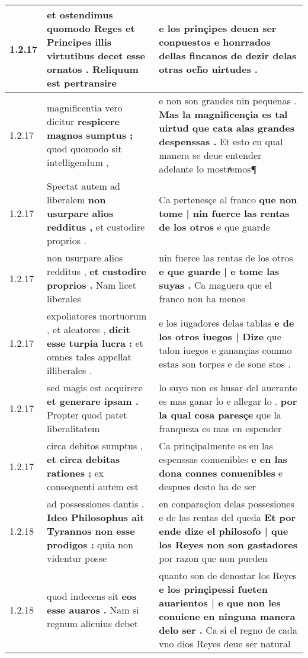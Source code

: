 \begin{tabular}{|p{1cm}|p{6.5cm}|p{6.5cm}|}
1.2.17 & et ostendimus quomodo Reges et Principes illis virtutibus decet \textbf{ esse ornatos . } Reliquum est pertransire & e los prinçipes deuen ser conpuestos e honrrados \textbf{ dellas fincanos } de dezir delas otras och̃o uirtudes . \\\hline
1.2.17 & magnificentia vero dicitur \textbf{ respicere magnos sumptus ; } quod quomodo sit intelligendum , & e non son grandes nin pequenas . \textbf{ Mas la magnificençia es tal uirtud que cata alas grandes despenssas . } Et esto en qual manera se deue entender adelante lo mostrͣemos¶ \\\hline
1.2.17 & Spectat autem ad liberalem \textbf{ non usurpare alios redditus , } et custodire proprios . & Ca pertenesçe al franco \textbf{ que non tome | nin fuerce las rentas de los otros } e que guarde \\\hline
1.2.17 & non usurpare alios redditus , \textbf{ et custodire proprios . } Nam licet liberales & nin fuerce las rentas de los otros \textbf{ e que guarde | e tome las suyas . } Ca maguera que el franco non ha menos \\\hline
1.2.17 & expoliatores mortuorum , et aleatores , \textbf{ dicit esse turpia lucra : } et omnes tales appellat illiberales . & e los iugadores delas tablas \textbf{ e de los otros iuegos | Dize } que talon iuegos e ganançias commo estas son torpes e de sone stos . \\\hline
1.2.17 & sed magis est acquirere \textbf{ et generare ipsam . } Propter quod patet liberalitatem & lo suyo non es husar del auerante es mas ganar lo e allegar lo . \textbf{ por la qual cosa paresçe } que la franqueza es mas en espender \\\hline
1.2.17 & circa debitos sumptus , \textbf{ et circa debitas rationes ; } ex consequenti autem est & Ca prinçipalmente es en las espenssas conuenibles \textbf{ e en las dona connes conuenibles } e despues desto ha de ser \\\hline
1.2.18 & ad possessiones dantis . \textbf{ Ideo Philosophus ait Tyrannos non esse prodigos : } quia non videntur posse & en conparaçion delas possesiones e de las rentas del queda \textbf{ Et por ende dize el philosofo | que los Reyes non son gastadores } por razon que non pueden \\\hline
1.2.18 & quod indecens sit \textbf{ eos esse auaros . } Nam si regnum alicuius debet & quanto son de denostar los Reyes \textbf{ e los prinçipessi fueten auarientos | e que non les conuiene en ninguna manera delo ser . } Ca si el regno de cada vno dios Reyes deue ser natural \\\hline

\end{tabular}
